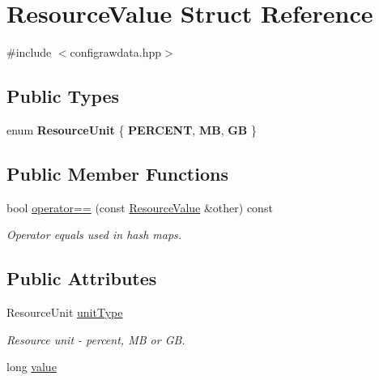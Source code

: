 \hypertarget{structResourceValue}{}\section{Resource\+Value Struct Reference}
\label{structResourceValue}


{\ttfamily \#include $<$configrawdata.\+hpp$>$}

\subsection*{Public Types}
\begin{DoxyCompactItemize}
\item 
enum {\bfseries Resource\+Unit} \{ {\bfseries P\+E\+R\+C\+E\+NT}, 
{\bfseries MB}, 
{\bfseries GB}
 \}\hypertarget{structResourceValue_a00678b22544eff855517fd5581a297e4}{}\label{structResourceValue_a00678b22544eff855517fd5581a297e4}

\end{DoxyCompactItemize}
\subsection*{Public Member Functions}
\begin{DoxyCompactItemize}
\item 
bool \hyperlink{structResourceValue_aafbfea4233908d8af735277733c77d8a}{operator==} (const \hyperlink{structResourceValue}{Resource\+Value} \&other) const \hypertarget{structResourceValue_aafbfea4233908d8af735277733c77d8a}{}\label{structResourceValue_aafbfea4233908d8af735277733c77d8a}

\begin{DoxyCompactList}\small\item\em Operator equals used in hash maps. \end{DoxyCompactList}\end{DoxyCompactItemize}
\subsection*{Public Attributes}
\begin{DoxyCompactItemize}
\item 
Resource\+Unit \hyperlink{structResourceValue_a983137c0fb106819f0aefa6234e3b215}{unit\+Type}\hypertarget{structResourceValue_a983137c0fb106819f0aefa6234e3b215}{}\label{structResourceValue_a983137c0fb106819f0aefa6234e3b215}

\begin{DoxyCompactList}\small\item\em Resource unit -\/ percent, MB or GB. \end{DoxyCompactList}\item 
long \hyperlink{structResourceValue_ae99ce89cc98c9032fdf5bccd9320ed2f}{value}
\end{DoxyCompactItemize}


